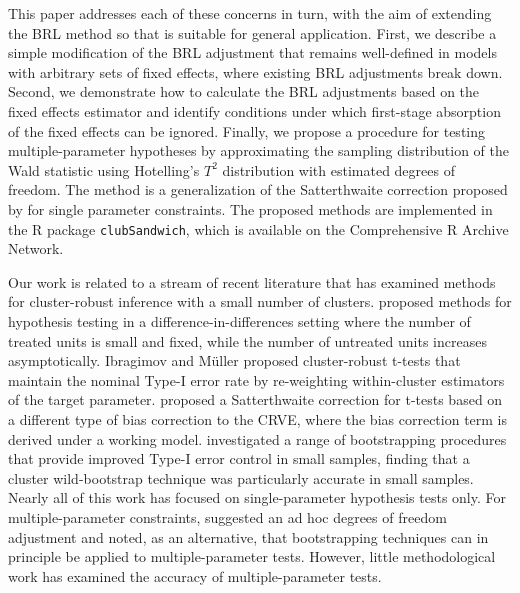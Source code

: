 \documentclass[12pt]{article}
\begin{document}
This paper addresses each of these concerns in turn, with the aim of
extending the BRL method so that is suitable for general application.
First, we describe a simple modification of the BRL adjustment that
remains well-defined in models with arbitrary sets of fixed effects,
where existing BRL adjustments break down. Second, we demonstrate how to
calculate the BRL adjustments based on the fixed effects estimator and
identify conditions under which first-stage absorption of the fixed
effects can be ignored. Finally, we propose a procedure for testing
multiple-parameter hypotheses by approximating the sampling distribution
of the Wald statistic using Hotelling's \(T^2\) distribution with
estimated degrees of freedom. The method is a generalization of the
Satterthwaite correction proposed by \citet{Bell2002bias} for single
parameter constraints. The proposed methods are implemented in the R
package \texttt{clubSandwich}, which is available on the Comprehensive R
Archive Network.

Our work is related to a stream of recent literature that has examined
methods for cluster-robust inference with a small number of clusters.
\citet{Conley2011inference} proposed methods for hypothesis testing in a
difference-in-differences setting where the number of treated units is
small and fixed, while the number of untreated units increases
asymptotically. Ibragimov and Müller
\citetext{\citeyear{Ibragimov2010tstatistic}; \citeyear{Ibragimov2016inference}}
proposed cluster-robust t-tests that maintain the nominal Type-I error
rate by re-weighting within-cluster estimators of the target parameter.
\citet{Young2016improved} proposed a Satterthwaite correction for
t-tests based on a different type of bias correction to the CRVE, where
the bias correction term is derived under a working model.
\citet{Cameron2008bootstrap} investigated a range of bootstrapping
procedures that provide improved Type-I error control in small samples,
finding that a cluster wild-bootstrap technique was particularly
accurate in small samples. Nearly all of this work has focused on
single-parameter hypothesis tests only. For multiple-parameter
constraints, \citet{Cameron2015practitioners} suggested an ad hoc
degrees of freedom adjustment and noted, as an alternative, that
bootstrapping techniques can in principle be applied to
multiple-parameter tests. However, little methodological work has
examined the accuracy of multiple-parameter tests.
\end{document}
